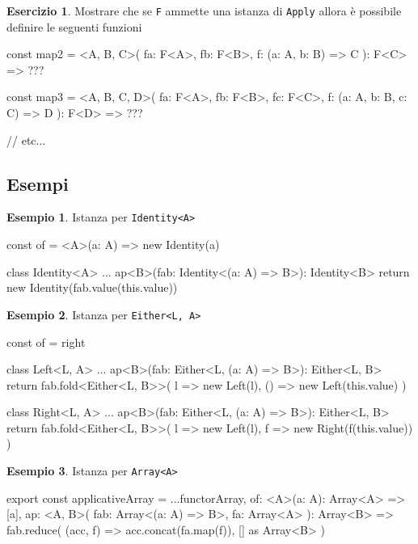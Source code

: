 \documentclass[12pt]{article}
\theoremstyle{definition}
\newtheorem{example}{Esempio}[section]
\newtheorem{exercise}{Esercizio}[section]
\newenvironment{code}
  {\vspace{0.5cm} \VerbatimEnvironment\begin{typescriptcode}}
  {\end{typescriptcode} \vspace{0.2cm}}
\begin{document}
\begin{exercise}
Mostrare che se \texttt{F} ammette una istanza di \texttt{Apply} allora è possibile definire le seguenti funzioni

\begin{code}
const map2 = <A, B, C>(
  fa: F<A>,
  fb: F<B>,
  f: (a: A, b: B) => C
): F<C> => ???

const map3 = <A, B, C, D>(
  fa: F<A>,
  fb: F<B>,
  fc: F<C>,
  f: (a: A, b: B, c: C) => D
): F<D> => ???

// etc...
\end{code}
\end{exercise}

\subsection{Esempi}

\begin{example}
Istanza per \texttt{Identity<A>}

\begin{code}
const of = <A>(a: A) => new Identity(a)

class Identity<A> {
  ...
  ap<B>(fab: Identity<(a: A) => B>): Identity<B> {
    return new Identity(fab.value(this.value))
  }
}
\end{code}
\end{example}

\begin{example}
Istanza per \texttt{Either<L, A>}

\begin{code}
const of = right

class Left<L, A> {
  ...
  ap<B>(fab: Either<L, (a: A) => B>): Either<L, B> {
    return fab.fold<Either<L, B>>(
      l => new Left(l),
      () => new Left(this.value)
    )
  }
}

class Right<L, A> {
  ...
  ap<B>(fab: Either<L, (a: A) => B>): Either<L, B> {
    return fab.fold<Either<L, B>>(
      l => new Left(l),
      f => new Right(f(this.value))
    )
  }
}
\end{code}
\end{example}

\begin{example}
Istanza per \texttt{Array<A>}

\begin{code}
export const applicativeArray = {
  ...functorArray,
  of: <A>(a: A): Array<A> => [a],
  ap: <A, B>(
    fab: Array<(a: A) => B>,
    fa: Array<A>
  ): Array<B> =>
    fab.reduce(
      (acc, f) => acc.concat(fa.map(f)),
      [] as Array<B>
    )
}
\end{code}
\end{example}
\end{document}
